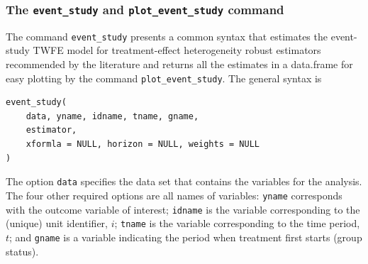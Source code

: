 \hypertarget{the-event_study-and-plot_event_study-command}{%
\subsubsection{\texorpdfstring{The \texttt{event\_study} and \texttt{plot\_event\_study} command}{The event\_study and plot\_event\_study command}}\label{the-event_study-and-plot_event_study-command}}

The command \texttt{event\_study} presents a common syntax that estimates the event-study TWFE model for treatment-effect heterogeneity robust estimators recommended by the literature and returns all the estimates in a data.frame for easy plotting by the command \texttt{plot\_event\_study}. The general syntax is

\begin{verbatim}
event_study(
    data, yname, idname, tname, gname, 
    estimator,
    xformla = NULL, horizon = NULL, weights = NULL
)
\end{verbatim}

The option \texttt{data} specifies the data set that contains the variables for the analysis. The four other required options are all names of variables: \texttt{yname} corresponds with the outcome variable of interest; \texttt{idname} is the variable corresponding to the (unique) unit identifier, \(i\); \texttt{tname} is the variable corresponding to the time period, \(t\); and \texttt{gname} is a variable indicating the period when treatment first starts (group status).

